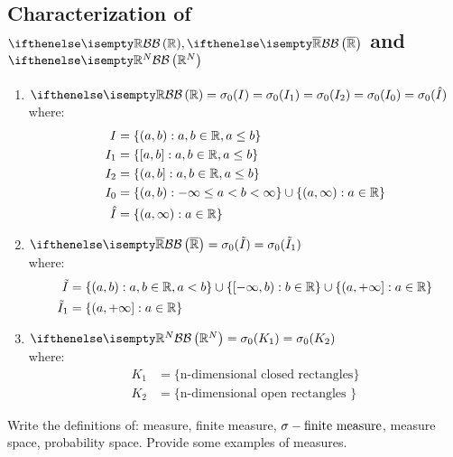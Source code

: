 \subsection{Characterization of \texorpdfstring{$\B[\R],\B[\Rcomp]$}{TEXT} and \texorpdfstring{$\B[\R^N]$}{TEXT}}
\begin{enumerate}
    \item $\B[\R]=\sigma_0(I)=\sigma_0(I_1)=\sigma_0(I_2)=\sigma_0(I_0)=\sigma_0(\hat{I})$\\
    where:
    \begin{align*}
        I&=\{ (a,b): a,b \in \mathbb{R}, a\leq b \} \\
        I_1&=\{ [a,b]: a,b \in \mathbb{R}, a\leq b \} \\
        I_2&=\{ (a,b]: a,b \in \mathbb{R}, a\leq b \} \\
        I_0&=\{ (a,b): -\infty\leq a < b <\infty \} \cup \{ (a,\infty): a\in\mathbb{R} \} \\
        \hat{I}&=\{ (a,\infty): a\in\mathbb{R} \}
    \end{align*}
    \item $\B[\Rcomp]=\sigma_0(\tilde{I})=\sigma_0(\tilde{I}_1)$\\
    where:
    \begin{align*}
        \tilde{I} &= \{ (a,b): a,b \in \mathbb{R}, a < b \} \cup \{ [-\infty,b): b\in\mathbb{R} \} \cup \{ (a,+\infty] : a\in\mathbb{R} \} \\
        \tilde{I}_1 &= \{ (a,+\infty] : a\in\mathbb{R} \}
    \end{align*}
    \item $\B[\R^N] = \sigma_0(K_1)=\sigma_0(K_2)$\\
    where:
    \begin{align*}
        K_1 &= \{ \text{n-dimensional closed rectangles}\}\\
        K_2 &= \{ \text{n-dimensional open rectangles }\}
    \end{align*}
\end{enumerate}

\question
Write the definitions of: measure, finite measure, $\sigma-\text{finite measure}$, measure space, probability
space. Provide some examples of measures.

